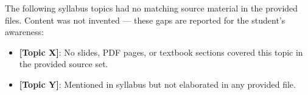 The following syllabus topics had no matching source material in the provided files.
Content was not invented --- these gaps are reported for the student's awareness:

\begin{itemize}
    \item \textbf{[Topic X]}: No slides, PDF pages, or textbook sections covered this topic
          in the provided source set.
    \item \textbf{[Topic Y]}: Mentioned in syllabus but not elaborated in any provided file.
\end{itemize}

%
%


%
%
%
%
%

